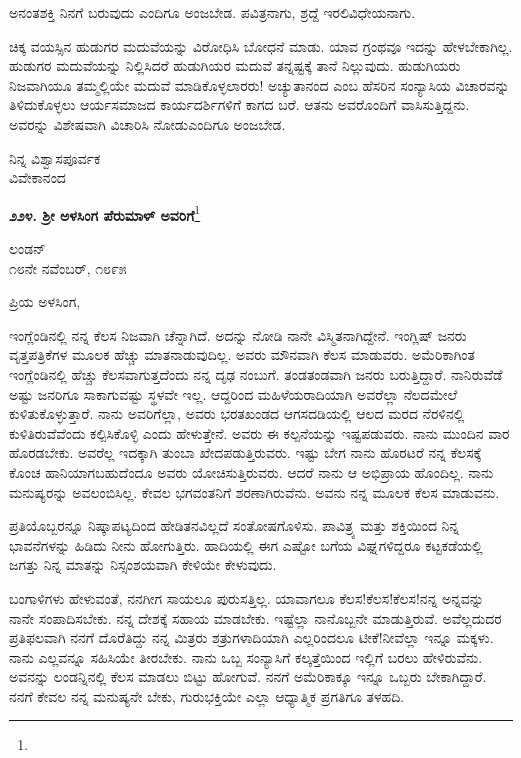 ಅನಂತಶಕ್ತಿ ನಿನಗೆ ಬರುವುದು\enginline{-} ಎಂದಿಗೂ ಅಂಜಬೇಡ. ಪವಿತ್ರನಾಗು, ಶ್ರದ್ದೆ ಇರಲಿ\enginline{-}ವಿಧೇಯನಾಗು.

\vspace{0.1cm}

ಚಿಕ್ಕ ವಯಸ್ಸಿನ ಹುಡುಗರ ಮದುವೆಯನ್ನು ವಿರೋಧಿಸಿ ಬೋಧನೆ ಮಾಡು. ಯಾವ ಗ್ರಂಥವೂ ಇದನ್ನು ಹೇಳಬೇಕಾಗಿಲ್ಲ. ಹುಡುಗರ ಮದುವೆಯನ್ನು ನಿಲ್ಲಿಸಿದರೆ ಹುಡುಗಿಯರ ಮದುವೆ ತನ್ನಷ್ಟಕ್ಕೆ ತಾನೆ ನಿಲ್ಲುವುದು. ಹುಡುಗಿಯರು ನಿಜವಾಗಿಯೂ ತಮ್ಮಲ್ಲಿಯೇ ಮದುವೆ ಮಾಡಿಕೊಳ್ಳಲಾರರು! ಅಚ್ಯುತಾನಂದ ಎಂಬ ಹೆಸರಿನ ಸಂನ್ಯಾಸಿಯ ವಿಚಾರವನ್ನು ತಿಳಿದುಕೊಳ್ಳಲು ಆರ್ಯಸಮಾಜದ ಕಾರ್ಯದರ್ಶಿಗಳಿಗೆ ಕಾಗದ ಬರೆ. ಆತನು ಅವರೊಂದಿಗೆ ವಾಸಿಸುತ್ತಿದ್ದನು. ಅವರನ್ನು ವಿಶೇಷವಾಗಿ ವಿಚಾರಿಸಿ ನೋಡು\enginline{-}ಎಂದಿಗೂ ಅಂಜಬೇಡ.

{\flushright
ನಿನ್ನ ವಿಶ್ವಾಸಪೂರ್ವಕ\\ವಿವೇಕಾನಂದ\par}

\newpage

\begin{center}
\textbf{೨೨೪. ಶ‍್ರೀ ಅಳಸಿಂಗ ಪೆರುಮಾಳ್ ಅವರಿಗೆ}\footnote{}
\end{center}

\begin{flushright}
ಲಂಡನ್\\೧೮ನೇ ನವೆಂಬರ್, ೧೮೯೫
\end{flushright}

\noindent
ಪ್ರಿಯ ಅಳಸಿಂಗ,

ಇಂಗ್ಲೆಂಡಿನಲ್ಲಿ ನನ್ನ ಕೆಲಸ ನಿಜವಾಗಿ ಚೆನ್ನಾಗಿದೆ. ಅದನ್ನು ನೋಡಿ ನಾನೇ ವಿಸ್ಮಿತನಾಗಿದ್ದೇನೆ. ಇಂಗ್ಲಿಷ್ ಜನರು ವೃತ್ತಪತ್ರಿಕೆಗಳ ಮೂಲಕ ಹೆಚ್ಚು ಮಾತನಾಡುವುದಿಲ್ಲ. ಅವರು ಮೌನವಾಗಿ ಕೆಲಸ ಮಾಡುವರು. ಅಮೆರಿಕಾಗಿಂತ ಇಂಗ್ಲೆಂಡಿನಲ್ಲಿ ಹೆಚ್ಚು ಕೆಲಸವಾಗುತ್ತದೆಂದು ನನ್ನ ದೃಢ ನಂಬುಗೆ. ತಂಡತಂಡವಾಗಿ ಜನರು ಬರುತ್ತಿದ್ದಾರೆ. ನಾನಿರುವೆಡೆ ಅಷ್ಟು ಜನರಿಗೂ ಸಾಕಾಗುವಷ್ಟು ಸ್ಥಳವೇ ಇಲ್ಲ. ಆದ್ದರಿಂದ ಮಹಿಳೆಯರಾದಿಯಾಗಿ ಅವರೆಲ್ಲಾ ನೆಲದಮೇಲೆ ಕುಳಿತುಕೊಳ್ಳುತ್ತಾರೆ. ನಾನು ಅವರಿಗೆಲ್ಲಾ, ಅವರು ಭರತಖಂಡದ ಆಗಸದಡಿಯಲ್ಲಿ ಆಲದ ಮರದ ನೆರಳಿನಲ್ಲಿ ಕುಳಿತಿರುವೆವೆಂದು ಕಲ್ಪಿಸಿಕೊಳ್ಳಿ ಎಂದು ಹೇಳುತ್ತೇನೆ. ಅವರು ಈ ಕಲ್ಪನೆಯನ್ನು ಇಷ್ಟಪಡುವರು. ನಾನು ಮುಂದಿನ ವಾರ ಹೊರಡಬೇಕು. ಅವರೆಲ್ಲ ಇದಕ್ಕಾಗಿ ತುಂಬಾ ಖೇದಪಡುತ್ತಿರುವರು. ಇಷ್ಟು ಬೇಗ ನಾನು ಹೊರಟರೆ ನನ್ನ ಕೆಲಸಕ್ಕೆ ಕೊಂಚ ಹಾನಿಯಾಗಬಹುದೆಂದೂ ಅವರು ಯೋಚಿಸುತ್ತಿರುವರು. ಆದರೆ ನಾನು ಆ ಅಭಿಪ್ರಾಯ ಹೊಂದಿಲ್ಲ. ನಾನು ಮನುಷ್ಯರನ್ನು ಅವಲಂಬಿಸಿಲ್ಲ. ಕೇವಲ ಭಗವಂತನಿಗೆ ಶರಣಾಗಿರುವೆನು. ಅವನು ನನ್ನ ಮೂಲಕ ಕೆಲಸ ಮಾಡುವನು.

ಪ್ರತಿಯೊಬ್ಬರನ್ನೂ ನಿಷ್ಕಾಪಟ್ಯದಿಂದ ಹೇಡಿತನವಿಲ್ಲದೆ ಸಂತೋಷಗೊಳಿಸು. ಪಾವಿತ್ರ್ಯ ಮತ್ತು ಶಕ್ತಿಯಿಂದ ನಿನ್ನ ಭಾವನೆಗಳನ್ನು ಹಿಡಿದು ನೀನು ಹೋಗುತ್ತಿರು. ಹಾದಿಯಲ್ಲಿ ಈಗ ಎಷ್ಟೋ ಬಗೆಯ ವಿಘ್ನಗಳಿದ್ದರೂ ಕಟ್ಟಕಡೆಯಲ್ಲಿ ಜಗತ್ತು ನಿನ್ನ ಮಾತನ್ನು ನಿಸ್ಸಂಶಯವಾಗಿ ಕೇಳಿಯೇ ಕೇಳುವುದು.

ಬಂಗಾಳಿಗಳು ಹೇಳುವಂತೆ, ನನಗೀಗ ಸಾಯಲೂ ಪುರುಸತ್ತಿಲ್ಲ. ಯಾವಾಗಲೂ ಕೆಲಸ!ಕೆಲಸ!ಕೆಲಸ!ನನ್ನ ಅನ್ನವನ್ನು ನಾನೇ ಸಂಪಾದಿಸಬೇಕು. ನನ್ನ ದೇಶಕ್ಕೆ ಸಹಾಯ ಮಾಡಬೇಕು. ಇಷ್ಟೆಲ್ಲಾ ನಾನೊಬ್ಬನೇ ಮಾಡುತ್ತಿರುವೆ. ಅವೆಲ್ಲದುದರ ಪ್ರತಿಫಲವಾಗಿ ನನಗೆ ದೊರೆತಿದ್ದು ನನ್ನ ಮಿತ್ರರು ಶತ್ರುಗಳಾದಿಯಾಗಿ ಎಲ್ಲರಿಂದಲೂ ಟೀಕೆ!ನೀವೆಲ್ಲಾ ಇನ್ನೂ ಮಕ್ಕಳು. ನಾನು ಎಲ್ಲವನ್ನೂ ಸಹಿಸಿಯೇ ತೀರಬೇಕು. ನಾನು ಒಬ್ಬ ಸಂನ್ಯಾಸಿಗೆ ಕಲ್ಕತ್ತೆಯಿಂದ ಇಲ್ಲಿಗೆ ಬರಲು ಹೇಳಿರುವೆನು. ಅವನನ್ನು ಲಂಡನ್ನಿನಲ್ಲಿ ಕೆಲಸ ಮಾಡಲು ಬಿಟ್ಟು ಹೋಗುವೆ. ನನಗೆ ಅಮೆರಿಕಾಕ್ಕೂ ಇನ್ನೂ ಒಬ್ಬರು ಬೇಕಾಗಿದ್ದಾರೆ. ನನಗೆ ಕೇವಲ ನನ್ನ ಮನುಷ್ಯನೇ ಬೇಕು, ಗುರುಭಕ್ತಿಯೇ ಎಲ್ಲಾ ಆಧ್ಯಾತ್ಮಿಕ ಪ್ರಗತಿಗೂ ತಳಹದಿ.

